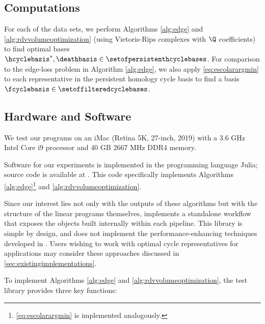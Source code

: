 \subsection{Computations}

For each of the data sets, we perform Algorithms \ref{alg:edge} and \ref{alg:rdvvolumeoptimization} (using Vietoris-Rips complexes with $\Q$ coefficients) to find optimal bases $\hcyclebasis^*, \deathbasis \in \setofpersistenthcyclebases$.  For comparison to the edge-loss problem in Algorithm \ref{alg:edge}, we also apply \pr \eqref{eq:escolarargmin} to each representative in the persistent homology cycle basis to find a basis $\fcyclebasis \in \setoffilteredcyclebases$.

\subsection{Hardware and Software}
\label{subsec:hardwaresoftware}

We test our programs on an iMac (Retina 5K, 27-inch, 2019) with a 3.6 GHz Intel Core i9 processor and 40 GB 2667 MHz DDR4 memory.


Software for our experiments is implemented in the programming language Julia; source code is available at \cite{li_thompson}.  This code specifically implements Algorithms \ref{alg:edge}\footnote{ \pr \eqref{eq:escolarargmin} is implemented analogously.} and \ref{alg:rdvvolumeoptimization}.


Since our interest lies not only with the outputs of these algorithms but with the structure of the linear programs themselves, \cite{li_thompson} implements a standalone workflow that exposes the objects built internally within each pipeline.  This library is simple by design, and does not implement the performance-enhancing techniques  developed in \cite{Escolar2016, Obayashi2018}. Users wishing to work with optimal cycle representatives for applications may consider these approaches %
discussed in \se \ref{sec:existingimplementations}.


To implement  Algorithms \ref{alg:edge} and \ref{alg:rdvvolumeoptimization}, the test library \cite{li_thompson} provides three key functions: %


